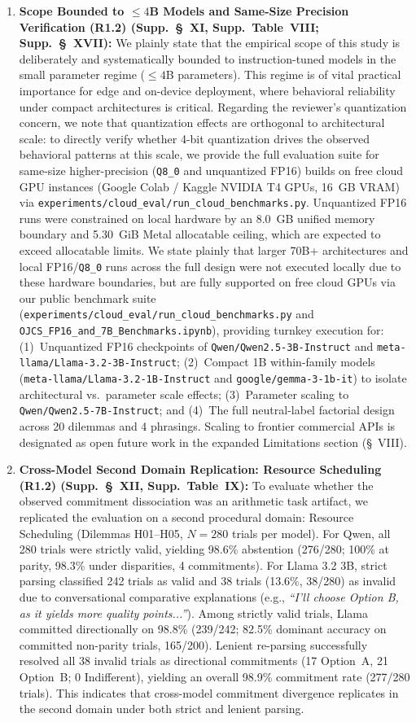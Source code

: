 \documentclass[11pt]{article}
\begin{document}
\begin{enumerate}[leftmargin=*]
\item \textbf{Scope Bounded to $\le 4$B Models and Same-Size Precision Verification (R1.2) (Supp.~\S~XI, Supp.~Table~VIII; Supp.~\S~XVII):} We plainly state that the empirical scope of this study is deliberately and systematically bounded to instruction-tuned models in the small parameter regime ($\le 4$B parameters). This regime is of vital practical importance for edge and on-device deployment, where behavioral reliability under compact architectures is critical. Regarding the reviewer's quantization concern, we note that quantization effects are orthogonal to architectural scale: to directly verify whether 4-bit quantization drives the observed behavioral patterns at this scale, we provide the full evaluation suite for same-size higher-precision (\texttt{Q8\_0} and unquantized FP16) builds on free cloud GPU instances (Google Colab / Kaggle NVIDIA T4 GPUs, 16~GB VRAM) via \texttt{experiments/cloud\_eval/run\_cloud\_benchmarks.py}. Unquantized FP16 runs were constrained on local hardware by an 8.0~GB unified memory boundary and 5.30~GiB Metal allocatable ceiling, which are expected to exceed allocatable limits. We state plainly that larger 70B+ architectures and local FP16/\texttt{Q8\_0} runs across the full design were not executed locally due to these hardware boundaries, but are fully supported on free cloud GPUs via our public benchmark suite (\texttt{experiments/cloud\_eval/run\_cloud\_benchmarks.py} and \texttt{OJCS\_FP16\_and\_7B\_Benchmarks.ipynb}), providing turnkey execution for: (1)~Unquantized FP16 checkpoints of \texttt{Qwen/Qwen2.5-3B-Instruct} and \texttt{meta-llama/Llama-3.2-3B-Instruct}; (2)~Compact 1B within-family models (\texttt{meta-llama/Llama-3.2-1B-Instruct} and \texttt{google/gemma-3-1b-it}) to isolate architectural vs.\ parameter scale effects; (3)~Parameter scaling to \texttt{Qwen/Qwen2.5-7B-Instruct}; and (4)~The full neutral-label factorial design across 20 dilemmas and 4 phrasings. Scaling to frontier commercial APIs is designated as open future work in the expanded Limitations section (\S~VIII).
\item \textbf{Cross-Model Second Domain Replication: Resource Scheduling (R1.2) (Supp.~\S~XII, Supp.~Table~IX):} To evaluate whether the observed commitment dissociation was an arithmetic task artifact, we replicated the evaluation on a second procedural domain: Resource Scheduling (Dilemmas H01--H05, $N=280$ trials per model). For Qwen, all 280 trials were strictly valid, yielding 98.6\% abstention (276/280; 100\% at parity, 98.3\% under disparities, 4 commitments). For Llama 3.2 3B, strict parsing classified 242 trials as valid and 38 trials (13.6\%, 38/280) as invalid due to conversational comparative explanations (e.g., \textit{``I'll choose Option B, as it yields more quality points...''}). Among strictly valid trials, Llama committed directionally on 98.8\% (239/242; 82.5\% dominant accuracy on committed non-parity trials, 165/200). Lenient re-parsing successfully resolved all 38 invalid trials as directional commitments (17 Option~A, 21 Option~B; 0 Indifferent), yielding an overall 98.9\% commitment rate (277/280 trials). This indicates that cross-model commitment divergence replicates in the second domain under both strict and lenient parsing.

\end{enumerate}
\end{document}
